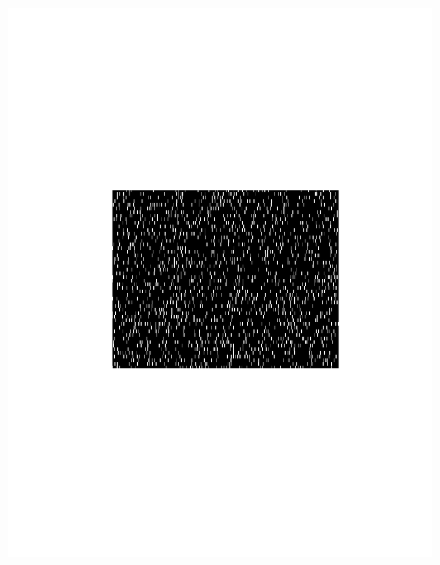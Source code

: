 \begin{figure}
\centering
\begin{minipage}[c]{0.45\hsize}
\includegraphics[width=\hsize]{../figs/Figure7b_raster_weak}
\end{minipage}
\begin{minipage}[c]{0.45\hsize}

\end{minipage}
\end{figure}
